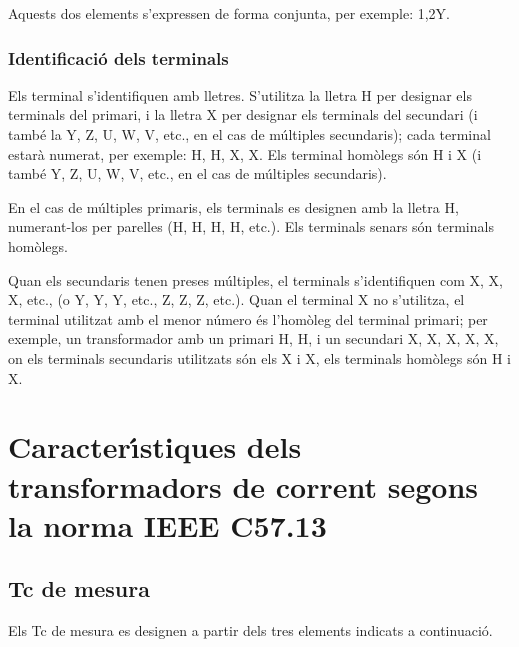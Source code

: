 Aquests dos elements s'expressen de forma conjunta, per exemple:
1,2Y.

\subsubsection{Identificaci\'{o} dels terminals}

Els terminal s'identifiquen amb lletres. S'utilitza la lletra H per designar els terminals del primari, i la lletra X per designar els terminals del secundari (i tamb\'{e} la Y, Z, U, W, V,  etc.{}, en el cas de m\'{u}ltiples secundaris); cada terminal estar\`{a} numerat, per exemple: H, H,  X, X. Els terminal hom\`{o}legs s\'{o}n H i X (i tamb\'{e} Y, Z, U, W, V, etc.{}, en el cas de m\'{u}ltiples secundaris).

En el cas de m\'{u}ltiples primaris, els terminals es designen amb la lletra H, numerant-los per parelles (H, H, H, H, etc.{}). Els terminals senars s\'{o}n terminals hom\`{o}legs.

Quan els secundaris tenen preses m\'{u}ltiples, el terminals s'identifiquen com X, X, X, etc.{}, (o Y, Y, Y, etc.{}, Z, Z, Z, etc.{}). Quan el terminal X no s'utilitza, el terminal utilitzat amb el menor n\'{u}mero \'{e}s l'hom\`{o}leg del terminal primari; per exemple, un transformador amb un primari H, H, i un secundari  X, X, X, X, X, on els terminals secundaris utilitzats s\'{o}n els X i  X, els terminals hom\`{o}legs s\'{o}n H i X.


\section{Caracter\'{\i}stiques dels transformadors de corrent segons la norma \textsf{IEEE C57.13}}


\subsection{Tc de mesura}

Els Tc de mesura  es designen a partir
dels tres elements indicats a continuaci\'{o}.

